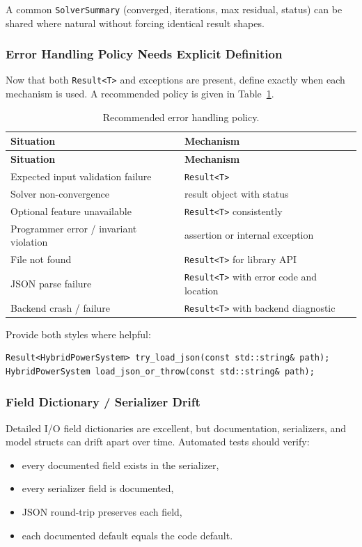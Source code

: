 A common \texttt{SolverSummary} (converged, iterations, max residual, status)
can be shared where natural without forcing identical result shapes.

\subsubsection{Error Handling Policy Needs Explicit Definition}

Now that both \texttt{Result<T>} and exceptions are present, define exactly
when each mechanism is used.  A recommended policy is given in
Table~\ref{tab:error-policy}.

\begin{longtable}{ll}
\caption{Recommended error handling policy.\label{tab:error-policy}} \\
\hline\hline
\textbf{Situation} & \textbf{Mechanism} \\
\hline\endfirsthead\hline\hline\textbf{Situation}&\textbf{Mechanism}\\\hline\endhead\hline\endfoot
Expected input validation failure & \texttt{Result<T>} \\
Solver non-convergence & result object with status \\
Optional feature unavailable & \texttt{Result<T>} consistently \\
Programmer error / invariant violation & assertion or internal exception \\
File not found & \texttt{Result<T>} for library API \\
JSON parse failure & \texttt{Result<T>} with error code and location \\
Backend crash / failure & \texttt{Result<T>} with backend diagnostic \\
\end{longtable}

Provide both styles where helpful:
\begin{verbatim}
Result<HybridPowerSystem> try_load_json(const std::string& path);
HybridPowerSystem load_json_or_throw(const std::string& path);
\end{verbatim}

\subsubsection{Field Dictionary / Serializer Drift}

Detailed I/O field dictionaries are excellent, but documentation, serializers,
and model structs can drift apart over time.  Automated tests should verify:
\begin{itemize}
  \item every documented field exists in the serializer,
  \item every serializer field is documented,
  \item JSON round-trip preserves each field,
  \item each documented default equals the code default.
\end{itemize}

